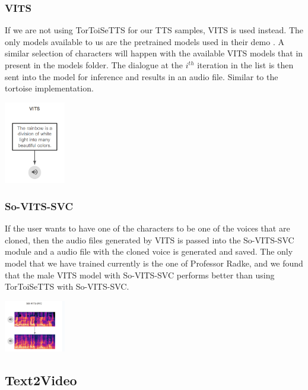 \documentclass[conference]{IEEEtran}
\begin{document}
\subsubsection{VITS}
If we are not using TorToiSeTTS for our TTS samples, VITS is used instead. The only models available to us are the pretrained models used in their demo \cite{vits-demo}. A similar selection of characters will happen with the available VITS models that in present in the models folder. The dialogue at the $i^{th}$ iteration in the list is then sent into the model for inference and results in an audio file. Similar to the tortoise implementation.

\begin{center}
\includegraphics[width=0.2\textwidth]{imgs/final-intermediate/vits.PNG}\\
\end{center}

\subsubsection{So-VITS-SVC}
If the user wants to have one of the characters to be one of the voices that are cloned, then the
audio files generated by VITS is passed into the So-VITS-SVC module and a audio file with the
cloned voice is generated and saved.
The only model that we have trained currently is the one of Professor Radke, and we found that
the male VITS model with So-VITS-SVC performs better than using TorToiSeTTS with So-VITS-SVC.

\begin{center}
\includegraphics[width=0.2\textwidth]{imgs/final-intermediate/sovits.PNG}\\
\end{center}

\subsection{Text2Video}
\end{document}
